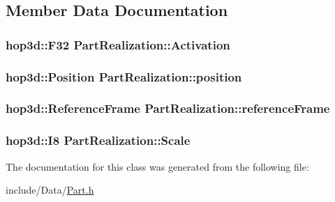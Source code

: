\subsection{Member Data Documentation}
\hypertarget{class_part_realization_a814790d0300a7f1b3be036031e92fec0}{
\subsubsection[{Activation}]{\setlength{\rightskip}{0pt plus 5cm}hop3d\-::\-F32 Part\-Realization\-::\-Activation}}\label{class_part_realization_a814790d0300a7f1b3be036031e92fec0}
\hypertarget{class_part_realization_a64e569cf60fcec7d6e31c47ea0a46e6e}{
\subsubsection[{position}]{\setlength{\rightskip}{0pt plus 5cm}hop3d\-::\-Position Part\-Realization\-::position}}\label{class_part_realization_a64e569cf60fcec7d6e31c47ea0a46e6e}
\hypertarget{class_part_realization_a31f7d192d8e527643997fa79aba5c28c}{
\subsubsection[{reference\-Frame}]{\setlength{\rightskip}{0pt plus 5cm}hop3d\-::\-Reference\-Frame Part\-Realization\-::reference\-Frame}}\label{class_part_realization_a31f7d192d8e527643997fa79aba5c28c}
\hypertarget{class_part_realization_acd7a731093a911fc165649d1a4baa96d}{
\subsubsection[{Scale}]{\setlength{\rightskip}{0pt plus 5cm}hop3d\-::\-I8 Part\-Realization\-::\-Scale}}\label{class_part_realization_acd7a731093a911fc165649d1a4baa96d}


The documentation for this class was generated from the following file\-:\begin{DoxyCompactItemize}
\item 
include/\-Data/\hyperlink{_part_8h}{Part.\-h}\end{DoxyCompactItemize}
